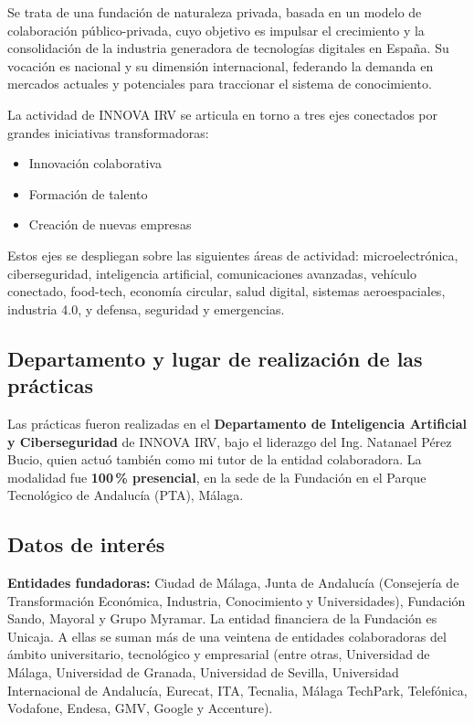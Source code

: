 Se trata de una fundación de naturaleza privada, basada en un modelo de colaboración público-privada, cuyo objetivo es impulsar el crecimiento y la consolidación de la industria generadora de tecnologías digitales en España. Su vocación es nacional y su dimensión internacional, federando la demanda en mercados actuales y potenciales para traccionar el sistema de conocimiento.

La actividad de INNOVA IRV se articula en torno a tres ejes conectados por grandes iniciativas transformadoras:
\begin{itemize}
  \item Innovación colaborativa
  \item Formación de talento
  \item Creación de nuevas empresas
\end{itemize}

Estos ejes se despliegan sobre las siguientes áreas de actividad: microelectrónica, ciberseguridad, inteligencia artificial, comunicaciones avanzadas, vehículo conectado, food-tech, economía circular, salud digital, sistemas aeroespaciales, industria 4.0, y defensa, seguridad y emergencias.

\subsection{Departamento y lugar de realización de las prácticas}

Las prácticas fueron realizadas en el \textbf{Departamento de Inteligencia Artificial y Ciberseguridad} de INNOVA IRV, bajo el liderazgo del Ing. Natanael Pérez Bucio, quien actuó también como mi tutor de la entidad colaboradora. La modalidad fue \textbf{100\,\% presencial}, en la sede de la Fundación en el Parque Tecnológico de Andalucía (PTA), Málaga.

\subsection{Datos de interés}

\textbf{Entidades fundadoras:} Ciudad de Málaga, Junta de Andalucía (Consejería de Transformación Económica, Industria, Conocimiento y Universidades), Fundación Sando, Mayoral y Grupo Myramar. La entidad financiera de la Fundación es Unicaja. A ellas se suman más de una veintena de entidades colaboradoras del ámbito universitario, tecnológico y empresarial (entre otras, Universidad de Málaga, Universidad de Granada, Universidad de Sevilla, Universidad Internacional de Andalucía, Eurecat, ITA, Tecnalia, Málaga TechPark, Telefónica, Vodafone, Endesa, GMV, Google y Accenture).

